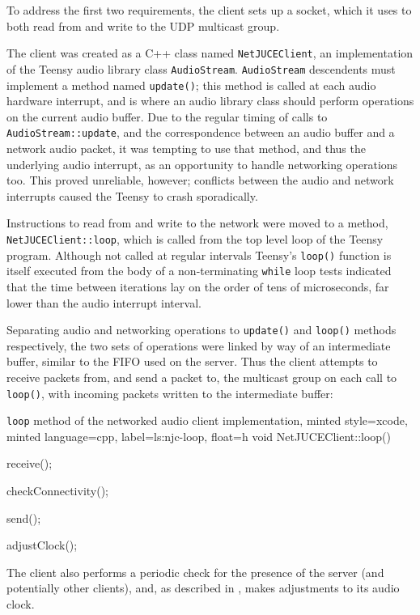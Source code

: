To address the first two requirements, the client sets up a socket, which it
uses to both read from and write to the UDP multicast group.

The client was created as a C++ class named \texttt{NetJUCEClient}, an
implementation of the Teensy audio library class \texttt{AudioStream}.
\texttt{AudioStream} descendents must implement a method named
\texttt{update()}; this method is called at each audio hardware interrupt, and
is where an audio library class should perform operations on the current
audio buffer.
Due to the regular timing of calls to \texttt{AudioStream::update}, and the
correspondence between an audio buffer and a network audio packet, it was
tempting to use that method, and thus the underlying audio interrupt, as an
opportunity to handle networking operations too.
This proved unreliable, however; conflicts between the audio and network
interrupts caused the Teensy to crash sporadically.

Instructions to read from and write to the network were moved to a method,
\texttt{NetJUCEClient::loop}, which is called from the top level loop of
the Teensy program.
Although not called at regular intervals \textemdash{} Teensy's \texttt{loop()}
function is itself executed from the body of a non-terminating \texttt{while}
loop \textemdash{} tests indicated that the time between iterations lay on the
order of tens of microseconds, far lower than the audio interrupt interval.

Separating audio and networking operations to \texttt{update()} and
\texttt{loop()} methods respectively, the two sets of operations were linked
by way of an intermediate buffer, similar to the FIFO used on the server.
Thus the client attempts to receive packets from, and send a packet to, the
multicast group on each call to \texttt{loop()}, with incoming packets written
to the intermediate buffer:

\begin{codelisting}{
    \texttt{loop} method of the networked audio client implementation,
    minted style=xcode,
    minted language=cpp,
    label=ls:njc-loop,
    float=h
}
    void NetJUCEClient::loop() {
        receive();

        checkConnectivity();

        send();

        adjustClock();
    }
\end{codelisting}
\noindent
The client also performs a periodic check for the presence of the server (and
potentially other clients),
and, as described in , makes adjustments to its
audio clock.

